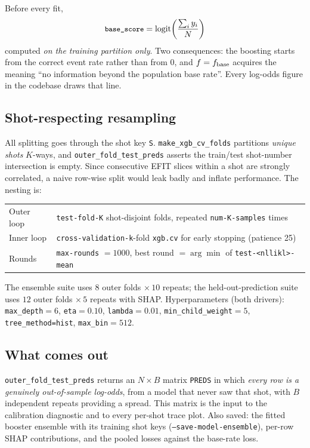 \documentclass[11pt,a4paper]{article}
\newcommand{\code}[1]{\texttt{\small #1}}
\newcommand{\logit}{\operatorname{logit}}
\begin{document}
Before every fit,
\begin{equation}
\code{base\_score} = \logit\!\left(\frac{\sum_i y_i}{N}\right)
\end{equation}
computed \emph{on the training partition only}. Two consequences: the boosting starts from the
correct event rate rather than from $0$, and $f = f_{\rm base}$ acquires the meaning ``no
information beyond the population base rate''. Every log-odds figure in the codebase draws that
line.

\subsection{Shot-respecting resampling}

All splitting goes through the shot key \code{S}. \code{make\_xgb\_cv\_folds} partitions
\emph{unique shots} $K$-ways, and \code{outer\_fold\_test\_preds} asserts the train/test shot-number
intersection is empty. Since consecutive EFIT slices within a shot are strongly correlated, a naive
row-wise split would leak badly and inflate performance. The nesting is:

\begin{center}
\begin{tabular}{@{}ll@{}}
\toprule
Outer loop & \code{test-fold-K} shot-disjoint folds, repeated \code{num-K-samples} times \\
Inner loop & \code{cross-validation-k}-fold \code{xgb.cv} for early stopping (patience 25) \\
Rounds & \code{max-rounds} $=1000$, best round $= \arg\min$ of \code{test-<nllikl>-mean} \\
\bottomrule
\end{tabular}
\end{center}

The ensemble suite uses $8$ outer folds $\times\,10$ repeats; the held-out-prediction suite uses
$12$ outer folds $\times\,5$ repeats with SHAP. Hyperparameters (both drivers):
\code{max\_depth}$=6$, \code{eta}$=0.10$, \code{lambda}$=0.01$, \code{min\_child\_weight}$=5$,
\code{tree\_method=hist}, \code{max\_bin}$=512$.

\subsection{What comes out}

\code{outer\_fold\_test\_preds} returns an $N \times B$ matrix \code{PREDS} in which
\emph{every row is a genuinely out-of-sample log-odds}, from a model that never saw that shot, with
$B$ independent repeats providing a spread. This matrix is the input to the calibration diagnostic
and to every per-shot trace plot. Also saved: the fitted booster ensemble with its training shot
keys (\code{--save-model-ensemble}), per-row SHAP contributions, and the pooled losses against the
base-rate loss.
\end{document}
